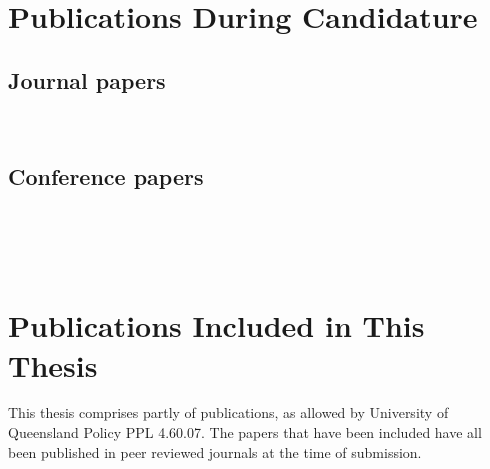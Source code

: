 \clearpage
\section*{Publications During Candidature}

\subsection*{Journal papers}

\noindent{}\\


\subsection*{Conference papers}

\noindent{}\\

\noindent{}\\

\noindent{}\\

\section*{Publications Included in This Thesis}

This thesis comprises partly of publications, as allowed by University of Queensland Policy PPL 4.60.07. The papers that have been included have all been published in peer reviewed journals at the time of submission. 

\vspace{\baselineskip}
\noindent
{}

